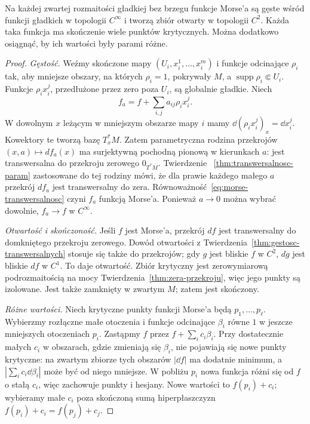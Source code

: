 \begin{twierdzenie}
\label{thm:gestosc-morse}
Na każdej zwartej rozmaitości gładkiej
bez brzegu funkcje Morse'a są gęste wśród
funkcji gładkich w topologii $C^\infty$
i tworzą zbiór otwarty w topologii $C^2$.
Każda taka funkcja ma skończenie wiele
punktów krytycznych. Można dodatkowo
osiągnąć, by ich wartości były parami różne.
\end{twierdzenie}
\begin{proof}
\emph{Gęstość.}
Weźmy skończone mapy $(U_i,x_i^1,\ldots,x_i^m)$
i funkcje odcinające $\rho_i$ tak, aby mniejsze
obszary, na których $\rho_i=1$, pokrywały $M$,
a $\operatorname{supp}\rho_i\Subset U_i$.
Funkcje $\rho_i x_i^j$, przedłużone przez
zero poza $U_i$, są globalnie gładkie.
Niech
\[
 f_a=f+\sum_{i,j}a_{ij}\rho_i x_i^j.
\]
W dowolnym $x$ leżącym w mniejszym obszarze
mapy $i$ mamy
$\dd(\rho_i x_i^j)_x=\dd x_i^j$.
Kowektory te tworzą bazę $T_x^*M$.
Zatem parametryczna rodzina przekrojów
$(x,a)\mapsto df_a(x)$ ma surjektywną
pochodną pionową w kierunkach $a$:
jest transwersalna do przekroju zerowego
$0_{T^*M}$. Twierdzenie
~\ref{thm:transwersalnosc-param}
zastosowane do tej rodziny mówi, że
dla prawie każdego małego $a$ przekrój
$df_a$ jest transwersalny do zera.
Równoważność~\eqref{eq:morse-transwersalnosc}
czyni $f_a$ funkcją Morse'a. Ponieważ
$a\to0$ można wybrać dowolnie,
$f_a\to f$ w $C^\infty$.

\emph{Otwartość i skończoność.}
Jeśli $f$ jest Morse'a, przekrój $df$
jest transwersalny do domkniętego
przekroju zerowego. Dowód otwartości
z Twierdzenia~\ref{thm:gestosc-transwersalnych}
stosuje się także do przekrojów;
gdy $g$ jest bliskie $f$ w $C^2$,
$dg$ jest bliskie $df$ w $C^1$.
To daje otwartość. Zbiór krytyczny
jest zerowymiarową podrozmaitością
na mocy Twierdzenia~\ref{thm:zera-przekroju},
więc jego punkty są izolowane.
Jest także zamknięty w zwartym $M$;
zatem jest skończony.

\emph{Różne wartości.}
Niech krytyczne punkty funkcji Morse'a
będą $p_1,\ldots,p_\ell$. Wybierzmy
rozłączne małe otoczenia i funkcje
odcinające $\beta_i$ równe $1$ w jeszcze
mniejszych otoczeniach $p_i$.
Zastąpmy $f$ przez
$f+\sum_i c_i\beta_i$.
Przy dostatecznie małych $c_i$ w obszarach,
gdzie zmieniają się $\beta_i$, nie pojawiają
się nowe punkty krytyczne: na zwartym
zbiorze tych obszarów $|\dd f|$ ma dodatnie
minimum, a $|\sum_i c_i\dd\beta_i|$ może
być od niego mniejsze. W pobliżu $p_i$
nowa funkcja różni się od $f$ o stałą
$c_i$, więc zachowuje punkty i hesjany.
Nowe wartości to $f(p_i)+c_i$; wybieramy
małe $c_i$ poza skończoną sumą hiperpłaszczyzn
$f(p_i)+c_i=f(p_j)+c_j$.
\end{proof}

